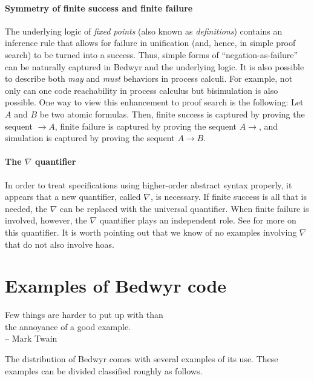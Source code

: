 \documentclass{article}
\begin{document}
\paragraph{Symmetry of finite success and finite failure}
The underlying logic of {\em fixed points} (also known as {\em
definitions})
\cite{girard92mail,schroeder-Heister93lics,mcdowell03tcs,momigliano03types}
contains an inference rule that allows for failure in unification
(and, hence, in simple proof search) to be turned into a success.
Thus, simple forms of ``negation-as-failure'' can be naturally
captured in Bedwyr and the underlying logic.  It is also possible to
describe both {\em may} and {\em must} behaviors in process calculi.
For example, not only can one code reachability in process calculus
but bisimulation is also possible.  One way to view this enhancement
to proof search is the following: Let $A$ and $B$ be two atomic
formulas.  Then, finite success is captured by proving the sequent
$\longrightarrow A$, finite failure is captured by proving the sequent
$A\longrightarrow$, and simulation is captured by proving the sequent
$A\longrightarrow B$.

\paragraph{The $\nabla$ quantifier}
In order to treat specifications using higher-order abstract syntax
properly, it appears that a new quantifier, called $\nabla$, is
necessary.  If finite success is all that is needed, the $\nabla$ can
be replaced with the universal quantifier.  When finite failure is
involved, however, the $\nabla$ quantifier plays an independent role.
See \cite{miller05tocl,tiu04phd,tiu05concur} for more on this
quantifier.  It is worth pointing out that we know of no examples
involving $\nabla$ that do not also involve hoas.

\section{Examples of Bedwyr code}

\begin{flushright}
Few things are harder to put up with than\\
the annoyance of a good example.\\
    -- Mark Twain
\end{flushright}

The distribution of Bedwyr comes with several examples of its use.
These examples can be divided classified roughly as follows.
\end{document}
